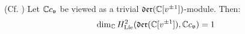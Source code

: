         \begin{lemma} \label{lemma: H^2_of_witt_algebra}
            (Cf. \cite[Proposition 1.3]{kac_raina_rozhkovskaya_bombay_lectures_on_highest_weight_modules_of_infinite_dimensional_lie_algebras}) Let $\mathbb{C} c_{\mathfrak{v}}$ be viewed as a trivial $\mathfrak{der}(\mathbb{C}[v^{\pm 1}])$-module. Then:
                $$\dim_{\mathbb{C}} H^2_{\mathrm{Lie}}( \mathfrak{der}(\mathbb{C}[v^{\pm 1}]), \mathbb{C} c_{\mathfrak{v}} ) = 1$$
        \end{lemma}